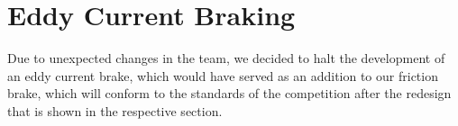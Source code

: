 \section{Eddy Current Braking}
Due to unexpected changes in the team, we decided to halt the development of an eddy current brake, which would have served as an addition to our friction brake, which will conform to the standards of the competition after the redesign that is shown in the respective section.